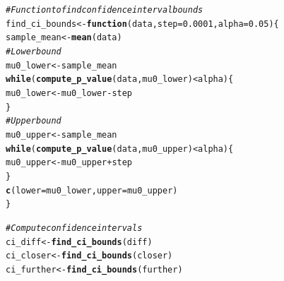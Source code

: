 \documentclass{article}\usepackage[]{graphicx}\usepackage[]{xcolor}
\makeatletter
\newcommand{\hlnum}[1]{\textcolor[rgb]{0.686,0.059,0.569}{#1}}%
\newcommand{\hlcom}[1]{\textcolor[rgb]{0.678,0.584,0.686}{\textit{#1}}}%
\newcommand{\hlopt}[1]{\textcolor[rgb]{0,0,0}{#1}}%
\newcommand{\hldef}[1]{\textcolor[rgb]{0.345,0.345,0.345}{#1}}%
\newcommand{\hlkwa}[1]{\textcolor[rgb]{0.161,0.373,0.58}{\textbf{#1}}}%
\newcommand{\hlkwb}[1]{\textcolor[rgb]{0.69,0.353,0.396}{#1}}%
\newcommand{\hlkwc}[1]{\textcolor[rgb]{0.333,0.667,0.333}{#1}}%
\newcommand{\hlkwd}[1]{\textcolor[rgb]{0.737,0.353,0.396}{\textbf{#1}}}%
\newenvironment{kframe}{%
 \def\at@end@of@kframe{}%
 \ifinner\ifhmode%
  \def\at@end@of@kframe{\end{minipage}}%
  \begin{minipage}{\columnwidth}%
 \fi\fi%
 \def\FrameCommand##1{\hskip\@totalleftmargin \hskip-\fboxsep
 \colorbox{shadecolor}{##1}\hskip-\fboxsep
     \hskip-\linewidth \hskip-\@totalleftmargin \hskip\columnwidth}%
 \MakeFramed {\advance\hsize-\width
   \@totalleftmargin\z@ \linewidth\hsize
   \@setminipage}}%
 {\par\unskip\endMakeFramed%
 \at@end@of@kframe}
\newenvironment{knitrout}{}{} %
\makeatother
\begin{document}
\begin{enumerate}
\begin{enumerate}
\begin{knitrout}
\begin{kframe}
\begin{alltt}
\hlcom{# Function to find confidence interval bounds}
\hldef{find_ci_bounds} \hlkwb{<-} \hlkwa{function}\hldef{(}\hlkwc{data}\hldef{,} \hlkwc{step} \hldef{=} \hlnum{0.0001}\hldef{,} \hlkwc{alpha} \hldef{=} \hlnum{0.05}\hldef{) \{}
  \hldef{sample_mean} \hlkwb{<-} \hlkwd{mean}\hldef{(data)}
  \hlcom{# Lower bound}
  \hldef{mu0_lower} \hlkwb{<-} \hldef{sample_mean}
  \hlkwa{while} \hldef{(}\hlkwd{compute_p_value}\hldef{(data, mu0_lower)} \hlopt{<} \hldef{alpha) \{}
    \hldef{mu0_lower} \hlkwb{<-} \hldef{mu0_lower} \hlopt{-} \hldef{step}
  \hldef{\}}
  \hlcom{# Upper bound}
  \hldef{mu0_upper} \hlkwb{<-} \hldef{sample_mean}
  \hlkwa{while} \hldef{(}\hlkwd{compute_p_value}\hldef{(data, mu0_upper)} \hlopt{<} \hldef{alpha) \{}
    \hldef{mu0_upper} \hlkwb{<-} \hldef{mu0_upper} \hlopt{+} \hldef{step}
  \hldef{\}}
  \hlkwd{c}\hldef{(}\hlkwc{lower} \hldef{= mu0_lower,} \hlkwc{upper} \hldef{= mu0_upper)}
\hldef{\}}

\hlcom{# Compute confidence intervals}
\hldef{ci_diff} \hlkwb{<-} \hlkwd{find_ci_bounds}\hldef{(diff)}
\hldef{ci_closer} \hlkwb{<-} \hlkwd{find_ci_bounds}\hldef{(closer)}
\hldef{ci_further} \hlkwb{<-} \hlkwd{find_ci_bounds}\hldef{(further)}


\end{alltt}
\end{kframe}
\end{knitrout}
\end{enumerate}
\end{enumerate}
\end{document}
